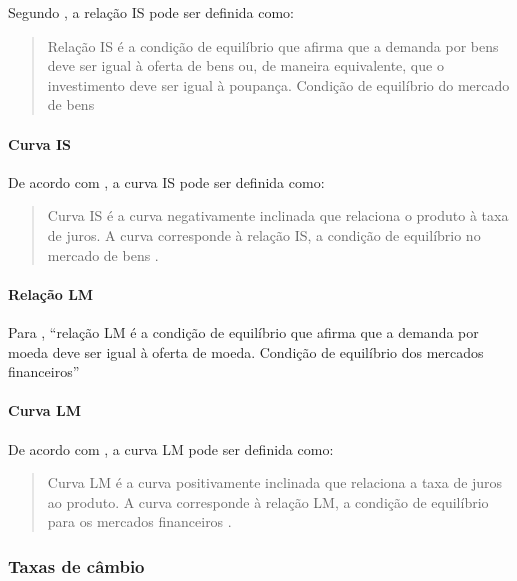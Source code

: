 \documentclass[]{article}
\let\oldparagraph\paragraph
\renewcommand{\paragraph}[1]{\oldparagraph{#1}\mbox{}}
\begin{document}
Segundo , a relação IS pode ser definida
como:

\begin{quote}
Relação IS é a condição de equilíbrio que afirma que a demanda por bens
deve ser igual à oferta de bens ou, de maneira equivalente, que o
investimento deve ser igual à poupança. Condição de equilíbrio do
mercado de bens \cite[p.~582]{blanchard}
\end{quote}

\paragraph{Curva IS}\label{curva-is}

De acordo com , a curva IS pode ser definida
como:

\begin{quote}
Curva IS é a curva negativamente inclinada que relaciona o produto à
taxa de juros. A curva corresponde à relação IS, a condição de
equilíbrio no mercado de bens \cite[p.~575]{blanchard}.
\end{quote}

\paragraph{Relação LM}\label{relacao-lm}

Para , ``relação LM é a condição de
equilíbrio que afirma que a demanda por moeda deve ser igual à oferta de
moeda. Condição de equilíbrio dos mercados financeiros''
\cite[p.~582]{blanchard}

\paragraph{Curva LM}\label{curva-lm}

De acordo com , a curva LM pode ser definida
como:

\begin{quote}
Curva LM é a curva positivamente inclinada que relaciona a taxa de juros
ao produto. A curva corresponde à relação LM, a condição de equilíbrio
para os mercados financeiros \cite[p.~575]{blanchard}.
\end{quote}

\subsubsection{Taxas de câmbio}\label{taxas-de-cambio}
\end{document}
